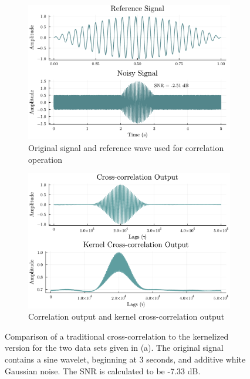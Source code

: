     \begin{figure} [h]
        \centering
        \begin{subfigure}[c]{0.49\textwidth}
            \centering
            \captionsetup{width=0.75\textwidth}
            \includegraphics[width=\textwidth]{images/Background/Cross Correlation Reference and Data.pdf}
            \caption{Original signal and reference wave used for correlation operation}
            \hfill
            \label{fig: original data set and ref}
        \end{subfigure}
        \hfill
            \begin{subfigure}[c]{0.49\textwidth}
            \centering
            \captionsetup{width=0.75\textwidth}
            \includegraphics[width=\textwidth]{images/Formulation/Correlation Comparisons.pdf}
            \caption{Correlation output and kernel cross-correlation output}
            \hfill
            \label{fig: Correlation outputs}
        \end{subfigure}
        \hfill
        \caption{Comparison of a traditional cross-correlation to the kernelized version for the two data sets given in (a). The original signal contains a sine wavelet, beginning at 3 seconds, and additive white Gaussian noise. The SNR is calculated to be -7.33 dB.}
        \label{fig:Maps examples}
        \hfill
    \end{figure}

